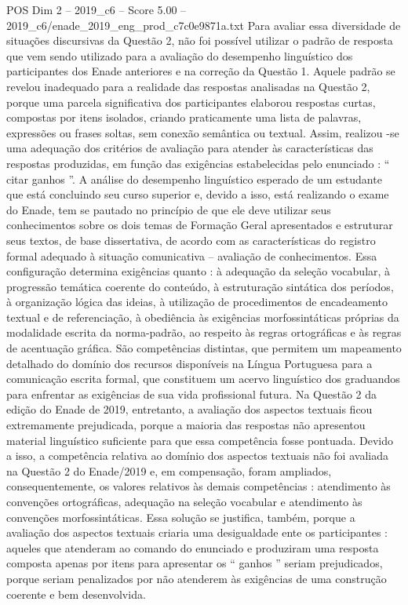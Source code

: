 \begin{textsample}{POS Dim 2 – 2019\_c6 – Score 5.00 – 2019\_c6/enade\_2019\_eng\_prod\_c7c0e9871a.txt}
Para avaliar essa diversidade de situações discursivas da Questão 2, não foi possível utilizar o padrão de resposta que vem sendo utilizado para a avaliação do desempenho linguístico dos participantes dos Enade anteriores e na correção da Questão 1.
Aquele padrão se revelou inadequado para a realidade das respostas analisadas na Questão 2, porque uma parcela significativa dos participantes elaborou respostas curtas, compostas por itens isolados, criando praticamente uma lista de palavras, expressões ou frases soltas, sem conexão semântica ou textual.
Assim, realizou -se uma adequação dos critérios de avaliação para atender às características das respostas produzidas, em função das exigências estabelecidas pelo enunciado : “ citar ganhos ”.
A análise do desempenho linguístico esperado de um estudante que está concluindo seu curso superior e, devido a isso, está realizando o exame do Enade, tem se pautado no princípio de que ele deve utilizar seus conhecimentos sobre os dois temas de Formação Geral apresentados e estruturar seus textos, de base dissertativa, de acordo com as características do registro formal adequado à situação comunicativa – avaliação de conhecimentos.
Essa configuração determina exigências quanto : à adequação da seleção vocabular, à progressão temática coerente do conteúdo, à estruturação sintática dos períodos, à organização lógica das ideias, à utilização de procedimentos de encadeamento textual e de referenciação, à obediência às exigências morfossintáticas próprias da modalidade escrita da norma-padrão, ao respeito às regras ortográficas e às regras de acentuação gráfica.
São competências distintas, que permitem um mapeamento detalhado do domínio dos recursos disponíveis na Língua Portuguesa para a comunicação escrita formal, que constituem um acervo linguístico dos graduandos para enfrentar as exigências de sua vida profissional futura.
Na Questão 2 da edição do Enade de 2019, entretanto, a avaliação dos aspectos textuais ficou extremamente prejudicada, porque a maioria das respostas não apresentou material linguístico suficiente para que essa competência fosse pontuada.
Devido a isso, a competência relativa ao domínio dos aspectos textuais não foi avaliada na Questão 2 do Enade/2019 e, em compensação, foram ampliados, consequentemente, os valores relativos às demais competências : atendimento às convenções ortográficas, adequação na seleção vocabular e atendimento às convenções morfossintáticas.
Essa solução se justifica, também, porque a avaliação dos aspectos textuais criaria uma desigualdade ente os participantes : aqueles que atenderam ao comando do enunciado e produziram uma resposta composta apenas por itens para apresentar os “ ganhos ” seriam prejudicados, porque seriam penalizados por não atenderem às exigências de uma construção coerente e bem desenvolvida.

\end{textsample}
